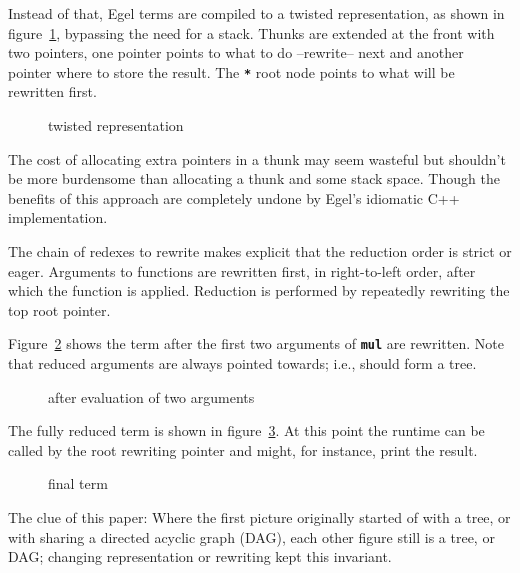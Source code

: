 \documentclass{research4cacm}
\newcommand{\code}[1]{{\bf\texttt{#1}}}
\begin{document}
Instead of that, Egel terms are compiled to a twisted representation,
as shown in figure~\ref{figure:termC}, bypassing the need
for a stack. Thunks are extended at the front with two pointers,
one pointer points to what to do --rewrite-- next and another pointer
where to store the result.
The \code{*} root node points to what will be rewritten first.

\begin{figure}[h]
\begin{center}
\caption{twisted representation}
\label{figure:termC}
\end{center}
\end{figure}

The cost of allocating extra pointers in a thunk may seem wasteful
but shouldn't be more burdensome than allocating a thunk and some
stack space. Though the benefits of this approach are completely
undone by Egel's idiomatic C++ implementation.

The chain of redexes to rewrite makes explicit that the reduction
order is strict or eager. Arguments to functions are rewritten first,
in right-to-left order, after which the function is applied.
Reduction is performed by repeatedly rewriting the top root pointer.

Figure~\ref{figure:termD} shows the term after the first two
arguments of \code{mul} are rewritten. Note that reduced
arguments are always pointed towards; i.e., should form a tree.

\begin{figure}[h]
\begin{center}
\caption{after evaluation of two arguments}
\label{figure:termD}
\end{center}
\end{figure}

The fully reduced term is shown in figure~\ref{figure:termE}. At
this point the runtime can be called by the root rewriting pointer
and might, for instance, print the result.

\begin{figure}[h]
\begin{center}
\caption{final term}
\label{figure:termE}
\end{center}
\end{figure}

The clue of this paper: Where the first picture originally started of
with a tree, or with sharing a directed acyclic graph (DAG), each
other figure still is a tree, or DAG; changing representation or 
rewriting kept this invariant.
\end{document}
